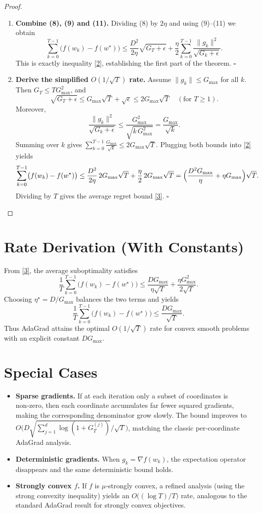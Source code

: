 \documentclass[11pt]{article}
\begin{document}
\begin{proof}
\begin{enumerate}
\item[Step 8.] \textbf{Combine (8), (9) and (11).}
Dividing (8) by $2\eta$ and using (9)–(11) we obtain
\[
\sum_{k=0}^{T-1}\bigl(f(w_k)-f(w^{\star})\bigr)
\le
\frac{D^{2}}{2\eta}\sqrt{G_T+\epsilon}
+\frac{\eta}{2}\sum_{k=0}^{T-1}\frac{\|g_k\|^{2}}{\sqrt{G_k+\epsilon}} .
\]
This is exactly inequality \eqref{2}, establishing the first part of the theorem. \hfill $\square$

\item[Step 9.] \textbf{Derive the simplified $O(1/\sqrt{T})$ rate.}
Assume $\|g_k\|\le G_{\max}$ for all $k$. Then $G_T\le TG_{\max}^{2}$, and
\[
\sqrt{G_T+\epsilon}\le G_{\max}\sqrt{T}+ \sqrt{\epsilon}\le 2G_{\max}\sqrt{T}
\quad (\text{for }T\ge1).
\]
Moreover,
\[
\frac{\|g_k\|^{2}}{\sqrt{G_k+\epsilon}}\le
\frac{G_{\max}^{2}}{\sqrt{k\,G_{\max}^{2}}}= \frac{G_{\max}}{\sqrt{k}} .
\]
Summing over $k$ gives $\sum_{k=0}^{T-1}\frac{G_{\max}}{\sqrt{k}}\le 2G_{\max}\sqrt{T}$. Plugging both bounds into \eqref{2} yields
\[
\sum_{k=0}^{T-1}\bigl(f(w_k)-f(w^{\star})\bigr)
\le
\frac{D^{2}}{2\eta}\,2G_{\max}\sqrt{T}
+\frac{\eta}{2}\,2G_{\max}\sqrt{T}
=
\Bigl(\frac{D^{2}G_{\max}}{\eta}+\eta G_{\max}\Bigr)\sqrt{T}.
\]
Dividing by $T$ gives the average regret bound \eqref{3}. \hfill $\square$
\end{enumerate}
\end{proof}

\section*{Rate Derivation (With Constants)}
From \eqref{3}, the average suboptimality satisfies
\[
\frac{1}{T}\sum_{k=0}^{T-1}\bigl(f(w_k)-f(w^{\star})\bigr)
\le
\frac{DG_{\max}}{\eta\sqrt{T}}+\frac{\eta G_{\max}^{2}}{2\sqrt{T}} .
\]
Choosing $\eta^{\star}=D/G_{\max}$ balances the two terms and yields
\[
\frac{1}{T}\sum_{k=0}^{T-1}\bigl(f(w_k)-f(w^{\star})\bigr)
\le
\frac{DG_{\max}}{\sqrt{T}} .
\]
Thus AdaGrad attains the optimal $O(1/\sqrt{T})$ rate for convex smooth problems with an explicit constant $DG_{\max}$.

\section*{Special Cases}
\begin{itemize}
\item \textbf{Sparse gradients.} If at each iteration only a subset of coordinates is non‑zero, then each coordinate accumulates far fewer squared gradients, making the corresponding denominator grow slowly. The bound improves to $O\bigl(D\sqrt{\sum_{j=1}^{d} \log(1+G_{T}^{(j)})}/\sqrt{T}\bigr)$, matching the classic per‑coordinate AdaGrad analysis.
\item \textbf{Deterministic gradients.} When $g_k=\nabla f(w_k)$, the expectation operator disappears and the same deterministic bound holds.
\item \textbf{Strongly convex $f$.} If $f$ is $\mu$‑strongly convex, a refined analysis (using the strong convexity inequality) yields an $O\bigl((\log T)/T\bigr)$ rate, analogous to the standard AdaGrad result for strongly convex objectives.
\end{itemize}
\end{document}
